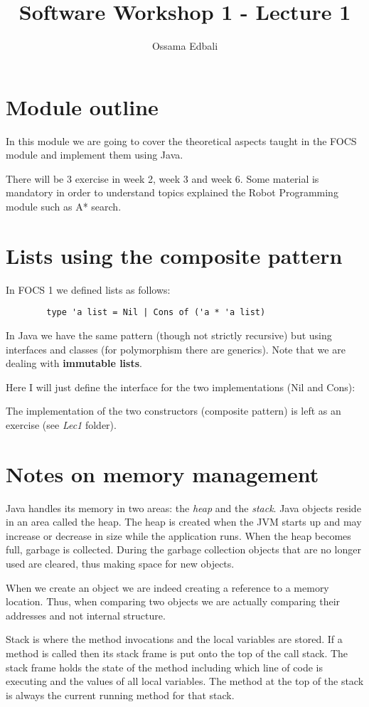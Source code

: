 \documentclass{article}
\title{Software Workshop 1 - Lecture 1}
\author{Ossama Edbali}
\begin{document}
	
	\lstset{language=Java, numbers=left}
	\maketitle
	
	\section{Module outline}
	In this module we are going to cover the theoretical aspects taught in the FOCS
	module and implement them using Java.
	
	There will be 3 exercise in week 2, week 3 and week 6. Some material
	is mandatory in order to understand topics explained the Robot Programming module such as
	A* search.
	
	\section{Lists using the composite pattern}
	In FOCS 1 we defined lists as follows:
	\begin{verbatim}
		type 'a list = Nil | Cons of ('a * 'a list)
	\end{verbatim}		
	
	In Java we have the same pattern (though not strictly recursive)
	but using interfaces and classes (for polymorphism
	there are generics). Note that we are dealing with \textbf{immutable lists}.
	
	Here I will just define the interface for the two implementations (Nil and Cons):
	
	
	The implementation of the two constructors (composite pattern) is left as an exercise
	(see \textit{Lec1} folder).	
	
	\section{Notes on memory management}
	Java handles its memory in two areas: the \textit{heap} and the \textit{stack}.
	Java objects reside in an area called the heap.
	The heap is created when the JVM starts up and may increase or decrease in size
	while the application runs. When the heap becomes full, garbage is collected.
	During the garbage collection objects that are no longer used are cleared,
	thus making space for new objects.	
	
	When we create an object we are indeed creating a reference to a memory location. Thus,
	when comparing two objects we are actually comparing their addresses and not internal
	structure.	
	
	Stack is where the method invocations and the local variables are stored.
	If a method is called then its stack frame is put onto the top of the call stack.
	The stack frame holds the state of the method including which line of code is
	executing and the values of all local variables.
	The method at the top of the stack is always the current running method for that stack.
\end{document}
